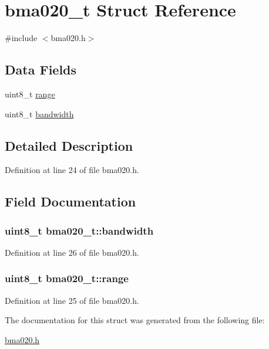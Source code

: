 \hypertarget{structbma020__t}{\section{bma020\-\_\-t Struct Reference}
\label{structbma020__t}
}


{\ttfamily \#include $<$bma020.\-h$>$}

\subsection*{Data Fields}
\begin{DoxyCompactItemize}
\item 
uint8\-\_\-t \hyperlink{structbma020__t_a63aac09de5dbbe22e4f8e34b7c1a48a8}{range}
\item 
uint8\-\_\-t \hyperlink{structbma020__t_a325e602de343e042a009df4f67185375}{bandwidth}
\end{DoxyCompactItemize}


\subsection{Detailed Description}


Definition at line 24 of file bma020.\-h.



\subsection{Field Documentation}
\hypertarget{structbma020__t_a325e602de343e042a009df4f67185375}{
\subsubsection[{bandwidth}]{\setlength{\rightskip}{0pt plus 5cm}uint8\-\_\-t bma020\-\_\-t\-::bandwidth}}\label{structbma020__t_a325e602de343e042a009df4f67185375}


Definition at line 26 of file bma020.\-h.

\hypertarget{structbma020__t_a63aac09de5dbbe22e4f8e34b7c1a48a8}{
\subsubsection[{range}]{\setlength{\rightskip}{0pt plus 5cm}uint8\-\_\-t bma020\-\_\-t\-::range}}\label{structbma020__t_a63aac09de5dbbe22e4f8e34b7c1a48a8}


Definition at line 25 of file bma020.\-h.



The documentation for this struct was generated from the following file\-:\begin{DoxyCompactItemize}
\item 
\hyperlink{bma020_8h}{bma020.\-h}\end{DoxyCompactItemize}
